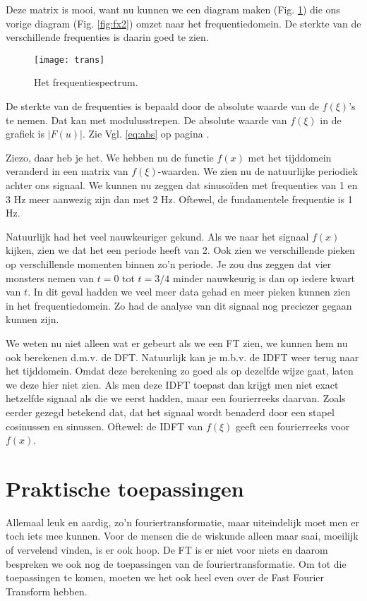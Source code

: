 \documentclass[11pt,fleqn]{book} %
\begin{document}
Deze matrix is mooi, want nu kunnen we een diagram maken (Fig. \ref{fig:trans}) die ons vorige diagram (Fig. \ref{fig:fx2}) omzet naar het frequentiedomein. De sterkte van de verschillende frequenties is daarin goed te zien.

\begin{figure}[h]
	\centering\texttt{[image: trans]}
	\caption{Het frequentiespectrum.}
	\label{fig:trans}
\end{figure}

De sterkte van de frequenties is bepaald door de absolute waarde van de $f(\xi)$'s te nemen. Dat kan met modulusstrepen. De absolute waarde van $f(\xi)$ in de grafiek is $\left|F(u)\right|$. Zie Vgl. \ref{eq:abs} op pagina \pageref{eq:abs}.

Ziezo, daar heb je het. We hebben nu de functie $f(x)$ met het tijddomein veranderd in een matrix van $f(\xi)$-waarden. We zien nu de natuurlijke periodiek achter ons signaal. We kunnen nu zeggen dat sinusoïden met frequenties van 1 en 3 Hz meer aanwezig zijn dan met 2 Hz. Oftewel, de fundamentele frequentie is 1 Hz.

Natuurlijk had het veel nauwkeuriger gekund. Als we naar het signaal $f(x)$ kijken, zien we dat het een periode heeft van 2. Ook zien we verschillende pieken op verschillende momenten binnen zo’n periode. Je zou dus zeggen dat vier monsters nemen van $t=0$ tot $t=3/4$ minder nauwkeurig is dan op iedere kwart van $t$. In dit geval hadden we veel meer data gehad en meer pieken kunnen zien in het frequentiedomein. Zo had de analyse van dit signaal nog preciezer gegaan kunnen zijn.

We weten nu niet alleen wat er gebeurt als we een FT zien, we kunnen hem nu ook berekenen d.m.v. de DFT. Natuurlijk kan je m.b.v. de IDFT weer terug naar het tijddomein. Omdat deze berekening zo goed als op dezelfde wijze gaat, laten we deze hier niet zien. Als men deze IDFT toepast dan krijgt men niet exact hetzelfde signaal als die we eerst hadden, maar een fourierreeks daarvan. Zoals eerder gezegd  betekend dat, dat het signaal wordt benaderd door een stapel cosinussen en sinussen. Oftewel: de IDFT van $f(\xi)$ geeft een fourierreeks voor $f(x)$.

\section{Praktische toepassingen}
Allemaal leuk en aardig, zo’n fouriertransformatie, maar uiteindelijk moet men er toch iets mee kunnen. Voor de mensen die de wiskunde alleen maar saai, moeilijk of vervelend vinden, is er ook hoop. De FT is er niet voor niets en daarom bespreken we ook nog de toepassingen van de fouriertransformatie. Om tot die toepassingen te komen, moeten we het ook heel even over de Fast Fourier Transform hebben.
\end{document}
